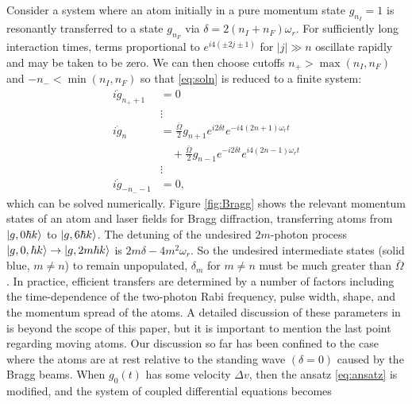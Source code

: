 \documentclass[reprint,
nofootinbib,
amsmath,amssymb,
aps]{revtex4-1}
\newcommand{\f}[2]{\frac{#1}{#2}}
\newcommand{\lb}{\left[}
\newcommand{\rb}{\right]}
\begin{document}
Consider a system where an atom initially in a pure momentum state $g_{n_I} = 1$ is resonantly transferred to a state $g_{n_F}$ via $\delta = 2(n_I + n_F)\omega_r$. For sufficiently long interaction times, terms proportional to $e^{i4(\pm 2j \pm  1)}$ for $|j|\gg n$ oscillate rapidly and may be taken to be zero. We can then choose cutoffs $n_+ > \max(n_I, n_F)$ and $-n_- < \min(n_I, n_F)$ so that \eqref{eq:soln} is reduced to a  finite system:
\begin{align*}
i\dot{g}_{n_++1} &= 0\\
&\vdots\\
i\dot{g}_{n} &= \f{\bar{\Omega}}{2} g_{n+1} e^{i2\delta t} e^{-i4(2n+1)\omega_r t}\\ 
&\quad+ \f{\bar{\Omega}}{2}g_{n-1} e^{-i2\delta t} e^{i4(2n-1)\omega_rt}\\
&\vdots\\
i\dot{g}_{-n_--1} &= 0,
\end{align*}
which can be solved numerically. Figure \ref{fig:Bragg} shows the relevant momentum states of an atom and laser fields for Bragg diffraction, transferring atoms from $\ket{g,0\hbar k}$ to $\ket{g,6\hbar k}$. The detuning of the undesired $2m$-photon process $\ket{g,0,\hbar k} \to \ket{g,2m\hbar k}$ is $2m\delta - 4m^2 \omega_r$. So the undesired intermediate states (solid blue, $m\neq n$) to remain unpopulated, $\delta_m$ for $m\neq n$ must be much greater than $\bar{\Omega}$. In practice, efficient transfers are determined by a number of factors including the time-dependence of the two-photon Rabi frequency, pulse width, shape, and the momentum spread of the atoms. A detailed discussion of these parameters in \cite{estey2016precision} is beyond the scope of this paper, but it is important to mention the last point regarding moving atoms. Our discussion so far has been confined to the case where the atoms are at rest relative to the standing wave $(\delta = 0)$ caused by the Bragg beams. When $g_0(t)$ has some velocity $\Delta v$, then the ansatz \eqref{eq:ansatz} is modified, and the system of coupled differential equations becomes
\end{document}
